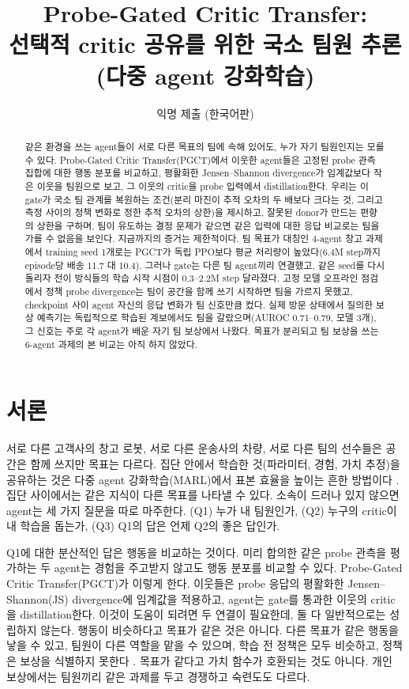 \documentclass[twocolumn,10pt]{article}
\title{Probe-Gated Critic Transfer:\\ 선택적 critic 공유를 위한 국소 팀원 추론\\ (다중 agent 강화학습)}
\author{익명 제출 (한국어판)}
\date{}
\theoremstyle{remark}
\newcommand{\ours}{PGCT}
\begin{document}
\maketitle

\begin{abstract}
같은 환경을 쓰는 agent들이 서로 다른 목표의 팀에 속해 있어도, 누가 자기 팀원인지는 모를 수 있다. Probe-Gated Critic
Transfer(\ours{})에서 이웃한 agent들은 고정된 probe 관측 집합에 대한 행동 분포를 비교하고, 평활화한 Jensen--Shannon
divergence가 임계값보다 작은 이웃을 팀원으로 보고, 그 이웃의 critic을 probe 입력에서 distillation한다. 우리는 이 gate가 국소
팀 관계를 복원하는 조건(분리 마진이 추적 오차의 두 배보다 크다는 것, 그리고 측정 사이의 정책 변화로 정한 추적 오차의 상한)을
제시하고, 잘못된 donor가 만드는 편향의 상한을 구하며, 팀이 유도하는 결정 문제가 같으면 같은 입력에 대한 응답 비교로는 팀을
가를 수 없음을 보인다. 지금까지의 증거는 제한적이다. 팀 목표가 대칭인 4-agent 창고 과제에서 training seed 1개로는 \ours{}가
독립 PPO보다 평균 처리량이 높았다(6.4M step까지 episode당 배송 11.7 대 10.4). 그러나 gate는 다른 팀 agent끼리 연결했고, 같은
seed를 다시 돌리자 전이 방식들의 학습 시작 시점이 0.3--2.2M step 달라졌다. 고정 모델 오프라인 점검에서 정책 probe
divergence는 팀이 공간을 함께 쓰기 시작하면 팀을 가르지 못했고, checkpoint 사이 agent 자신의 응답 변화가 팀 신호만큼 컸다.
실제 방문 상태에서 질의한 보상 예측기는 독립적으로 학습된 계보에서도 팀을 갈랐으며(AUROC 0.71--0.79, 모델 3개), 그 신호는
주로 각 agent가 배운 자기 팀 보상에서 나왔다. 목표가 분리되고 팀 보상을 쓰는 6-agent 과제의 본 비교는 아직 하지 않았다.
\end{abstract}

\section{서론}
서로 다른 고객사의 창고 로봇, 서로 다른 운송사의 차량, 서로 다른 팀의 선수들은 공간은 함께 쓰지만 목표는 다르다. 집단 안에서
학습한 것(파라미터, 경험, 가치 추정)을 공유하는 것은 다중 agent 강화학습(MARL)에서 표본 효율을 높이는 흔한 방법이다
\cite{christianos2020seac,christianos2021seps}. 집단 사이에서는 같은 지식이 다른 목표를 나타낼 수 있다. 소속이 드러나 있지
않으면 agent는 세 가지 질문을 따로 마주한다. (Q1) 누가 내 팀원인가, (Q2) 누구의 critic이 내 학습을 돕는가, (Q3) Q1의 답은
언제 Q2의 좋은 답인가.

Q1에 대한 분산적인 답은 행동을 비교하는 것이다. 미리 합의한 같은 probe 관측을 평가하는 두 agent는 경험을 주고받지 않고도
행동 분포를 비교할 수 있다. Probe-Gated Critic Transfer(\ours{})가 이렇게 한다. 이웃들은 probe 응답의 평활화한
Jensen--Shannon(JS) divergence에 임계값을 적용하고, agent는 gate를 통과한 이웃의 critic을 distillation한다. 이것이 도움이
되려면 두 연결이 필요한데, 둘 다 일반적으로는 성립하지 않는다. 행동이 비슷하다고 목표가 같은 것은 아니다. 다른 목표가 같은
행동을 낳을 수 있고, 팀원이 다른 역할을 맡을 수 있으며, 학습 전 정책은 모두 비슷하고, 정책은 보상을 식별하지 못한다
\cite{ng2000irl}. 목표가 같다고 가치 함수가 호환되는 것도 아니다. 개인 보상에서는 팀원끼리 같은 과제를 두고 경쟁하고 숙련도도
다르다.
\end{document}
